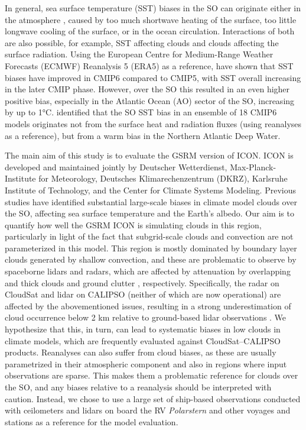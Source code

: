 \documentclass[draft]{agujournal2019}
\begin{document}
In general, sea surface temperature (SST) biases in the SO can originate either in the atmosphere , caused by too much shortwave heating of the surface, too little longwave cooling of the surface, or in the ocean circulation. Interactions of both are also possible, for example, SST affecting clouds and clouds affecting the surface radiation. Using the European Centre for Medium-Range Weather Forecasts (ECMWF) Reanalysis 5 (ERA5) as a reference,  have shown that SST biases have improved in CMIP6 compared to CMIP5, with SST overall increasing in the later CMIP phase. However, over the SO this resulted in an even higher positive bias, especially in the Atlantic Ocean (AO) sector of the SO, increasing by up to 1°C.  identified that the SO SST bias in an ensemble of 18 CMIP6 models originates not from the surface heat and radiation fluxes (using reanalyses as a reference), but from a warm bias in the Northern Atlantic Deep Water.

The main aim of this study is to evaluate the GSRM version of ICON. ICON is developed and maintained jointly by Deutscher Wetterdienst, Max-Planck-Institute for Meteorology, Deutsches Klimarechenzentrum (DKRZ), Karlsruhe Institute of Technology, and the Center for Climate Systems Modeling. Previous studies have identified substantial large-scale biases in climate model clouds over the SO, affecting sea surface temperature and the Earth’s albedo. Our aim is to quantify how well the GSRM ICON is simulating clouds in this region, particularly in light of the fact that subgrid-scale clouds and convection are not parameterized in this model. This region is mostly dominated by boundary layer clouds generated by shallow convection, and these are problematic to observe by spaceborne lidars and radars, which are affected by attenuation by overlapping and thick clouds  and ground clutter , respectively. Specifically, the radar on CloudSat and lidar on CALIPSO (neither of which are now operational) are affected by the abovementioned issues, resulting in a strong underestimation of cloud occurrence below 2 km relative to ground-based lidar observations . We hypothesize that this, in turn, can lead to systematic biases in low clouds in climate models, which are frequently evaluated against CloudSat--CALIPSO products. Reanalyses can also suffer from cloud biases, as these are usually parametrized in their atmospheric component and also in regions where input observations are sparse. This makes them a problematic reference for clouds over the SO, and any biases relative to a reanalysis should be interpreted with caution. Instead, we chose to use a large set of ship-based observations conducted with ceilometers and lidars on board the RV \emph{Polarstern} and other voyages and stations as a reference for the model evaluation.
\end{document}
